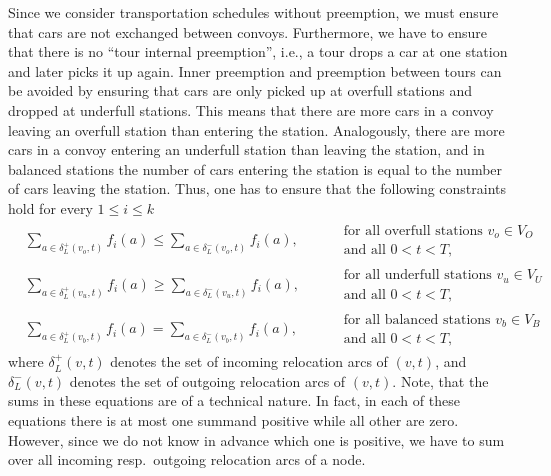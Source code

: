 \documentclass[english]{llncs}
\numberwithin{sublemma}{lemma}
\newcommand{\fc}{\ensuremath{f}}
\begin{document}
Since we consider transportation schedules without preemption, we must ensure that cars are not exchanged between convoys.
Furthermore, we have to ensure that there is no ``tour internal preemption'', i.e., a tour drops a car at one station and later picks it up again.
Inner preemption and preemption between tours can be avoided by ensuring that cars are only picked up at overfull stations and dropped at underfull stations.
This means that there are more cars in a convoy leaving an overfull station than entering the station.
Analogously, there are more cars in a convoy entering an underfull station than leaving the station, and in balanced stations the number of cars entering the station is equal to the number of cars leaving the station.
Thus, one has to ensure that the following constraints hold for every $1 \leq i \leq k$
\begin{align}
  & \sum_{a \in \delta^+_L(v_o, t)} \fc_i(a) \leq \sum_{a \in \delta^-_L(v_o, t)} \fc_i(a), && 
      \begin{aligned} 
          & \text{ for all overfull stations } v_o \in V_O \\
          & \text{ and all $0 < t < T$},
      \end{aligned} \label{eq: static: min-cost flows: flows: wo pre wo back: over under balanced: 1} \\
  & \sum_{a \in \delta^+_L(v_u, t)} \fc_i(a) \geq \sum_{a \in \delta^-_L(v_u, t)} \fc_i(a), &&
      \begin{aligned}
          & \text{ for all underfull stations } v_u \in V_U \\
          & \text{ and all $0 < t < T$},
      \end{aligned} \label{eq: static: min-cost flows: flows: wo pre wo back: over under balanced: 2} \\
  & \sum_{a \in \delta^+_L(v_b, t)} \fc_i(a) = \sum_{a \in \delta^-_L(v_b, t)} \fc_i(a), &&
      \begin{aligned}
          & \text{ for all balanced stations } v_b \in V_B \\
          & \text{ and all $0 < t < T$},
      \end{aligned} \label{eq: static: min-cost flows: flows: wo pre wo back: over under balanced: 3} 
\end{align}
where $\delta^+_L(v,t)$ denotes the set of incoming relocation arcs of $(v,t)$, and $\delta^-_L(v,t)$ denotes the set of outgoing relocation arcs of $(v,t)$.
Note, that the sums in these equations are of a technical nature.
In fact, in each of these equations there is at most one summand positive while all other are zero.
However, since we do not know in advance which one is positive, we have to sum over all incoming resp.~outgoing relocation arcs of a node.
\end{document}
